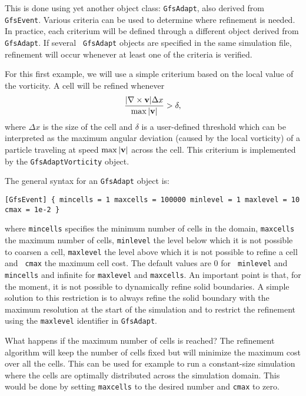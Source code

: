 \documentclass[a4paper]{article}
\begin{document}
This is done using yet another object class: {\tt GfsAdapt}, also derived 
from {\tt GfsEvent}. Various criteria can be used to determine where
refinement is needed. In practice, each criterium will be defined
through a different object derived from {\tt GfsAdapt}. If several {\tt 
GfsAdapt} objects are specified in the same simulation file, refinement 
will occur whenever at least one of the criteria is verified.

For this first example, we will use a simple criterium based on the
local value of the vorticity. A cell will be refined whenever
$$
{|\nabla\times{\bf v}|\Delta x\over\max|{\bf v}|} > \delta,
$$
where $\Delta x$ is the size of the cell and $\delta$ is a
user-defined threshold which can be interpreted as the maximum angular 
deviation (caused by the local vorticity) of a particle traveling at 
speed $\max|{\bf v}|$ across the cell. This criterium is implemented
by the {\tt GfsAdaptVorticity} object.

The general syntax for an {\tt GfsAdapt} object is:
\begin{verbatim}
[GfsEvent] { mincells = 1 maxcells = 100000 minlevel = 1 maxlevel = 10 cmax = 1e-2 }
\end{verbatim}
where {\tt mincells} specifies the minimum number of cells in the
domain, {\tt maxcells} the maximum number of cells, {\tt minlevel} the
level below which it is not possible to coarsen a cell, {\tt maxlevel}
the level above which it is not possible to refine a cell and {\tt
  cmax} the maximum cell cost. The default values are 0 for {\tt
  minlevel} and {\tt mincells} and infinite for {\tt maxlevel} and
{\tt maxcells}. An important point is that, for the moment, it is not
possible to dynamically refine solid boundaries. A simple solution to
this restriction is to always refine the solid boundary with the
maximum resolution at the start of the simulation and to restrict the
refinement using the {\tt maxlevel} identifier in {\tt GfsAdapt}.

What happens if the maximum number of cells is reached? The refinement algorithm will keep the number of cells fixed but will minimize the maximum cost over all the cells. This can be used for example to run a constant-size simulation where the cells are optimally distributed across the simulation domain. This would be done by setting {\tt maxcells} to the desired number and {\tt cmax} to zero.
\end{document}
